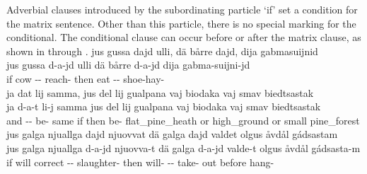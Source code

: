 Adverbial clauses introduced by the subordinating particle  ‘if’ set a condition for the matrix sentence. Other than this particle, there is no special marking for the conditional. 
The conditional clause can occur before or after the matrix clause, as shown in  through .%
\ea\label{conditionalClause1}%
\glll	jus gussa dajd ulli, dä bårre dajd, dija gabmasuijnid\\
	jus gussa d-a-jd ulli dä bårre d-a-jd dija gabma-suijni-jd\\
	if cow\BS{} -- reach- then eat\BS{} --  shoe-hay-\\\nopagebreak
{} 
\z
\ea\label{conditionalClause2}%
\glll	ja dat lij samma, jus del lij gualpana vaj biodaka vaj smav biedtsastak\\
	ja d-a-t li-j samma jus del lij gualpana vaj biodaka vaj smav biedtsastak\\
	and -- be- same if then be- flat\_pine\_heath\BS{} or high\_ground\BS{} or small\BS{} pine\_forest\BS{}\\\nopagebreak
{} 
\z
\ea\label{conditionalClause3}%
\glll	jus galga njuallga dajd njuovvat dä galga dajd valdet olgus åvdål gádsastam\\
	jus galga njuallga d-a-jd njuovva-t dä galga d-a-jd valde-t olgus åvdål gádsasta-m\\
	if will\BS{} correct -- slaughter- then will- -- take- out before hang-\\\nopagebreak
{} 
\z


